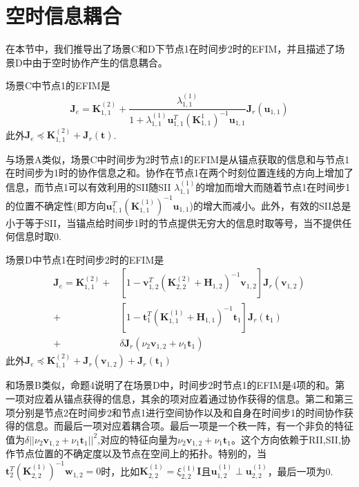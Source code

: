 \section{空时信息耦合}
在本节中，我们推导出了场景C和D下节点1在时间步2时的EFIM，并且描述了场景D中由于空时协作产生的信息耦合。
\begin{proposition}
场景C中节点1的EFIM是
\[
\bm{J}_e=\bm{K}_{1,1}^{(2)}+\frac{\lambda_{1,1}^{(1)}}{1+\lambda_{1,1}^{(1)}\bm{u}_{1,1}^T(\bm{K}_{1,1}^{1})^{-1}\bm{u}_{1,1}}\bm{J}_r(\bm{u}_{1,1})
\]
此外$\bm{J}_e \preceq \bm{K}_{1,1}^{(2)}+\bm{J}_r(\bm{t})$.
\end{proposition}
\begin{remark}
与场景A类似，场景C中时间步为2时节点1的EFIM是从锚点获取的信息和与节点1在时间步为1时的协作信息之和。协作在节点1在两个时刻位置连线的方向上增加了信息，而节点1可以有效利用的SII随SII $\lambda_{1,1}^{(1)}$的增加而增大而随着节点1在时间步1的位置不确定性(即方向$\bm{u}_{1,1}^T(\bm{K}_{1,1}^{(1)})^{-1}\bm{u}_{1,1}$)的增大而减小。此外，有效的SII总是小于等于SII，当锚点给时间步1时的节点提供无穷大的信息时取等号，当不提供任何信息时取0.
\end{remark}
\begin{proposition}
场景D中节点1在时间步2时的EFIM是
\begin{equation}
\begin{split}
\bm{J}_e=\bm{K}_{1,1}^{(2)}+&[1-\bm{v}_{1,2}^T(\bm{K}_{2,2}^{(2)}+\bm{H}_{1,2})^{-1}\bm{v}_{1,2}]\bm{J}_r(\bm{v}_{1,2})\\
+&[1-\bm{t}_1^T(\bm{K}_{1,1}^{(1)}+\bm{H}_{1,1})^{-1}\bm{t}_1]\bm{J}_r(\bm{t}_1)\\
+&\delta \bm{J}_r(\nu_2 \bm{v}_{1,2}+\nu_1 \bm{t}_1)
\end{split}
\end{equation}
此外$\bm{J}_e \preceq \bm{K}_{1,1}^{(2)}+\bm{J}_r(\bm{v}_{1,2})+\bm{J}_r(\bm{t}_1)$
\end{proposition}
\begin{remark}
和场景B类似，命题4说明了在场景D中，时间步2时节点1的EFIM是4项的和。第一项对应着从锚点获得的信息，其余的项对应着通过协作获得的信息。第二和第三项分别是节点2在时间步2和节点1进行空间协作以及和自身在时间步1的时间协作获得的信息。而最后一项对应着耦合项。最后一项是一个秩一阵，有一个非负的特征值为$\delta||\nu_2\bm{v}_{1,2}+\nu_1\bm{t}_1||^2$,对应的特征向量为$\nu_2\bm{v}_{1,2}+\nu_1\bm{t}_1$。这个方向依赖于RII,SII,协作节点位置的不确定度以及节点在空间上的拓扑。特别的，当$\bm{t}_2^T(\bm{K}_{2,2}^{(1)})^{-1}\bm{w}_{1,2}=0$时，比如$\bm{K}_{2,2}^{(1)}=\xi_{2,2}^{(1)}\bm{I}$且$\bm{u}_{1,2}^{(1)} \perp\bm{u}_{2,2}^{(1)}$，最后一项为0.
\end{remark}
